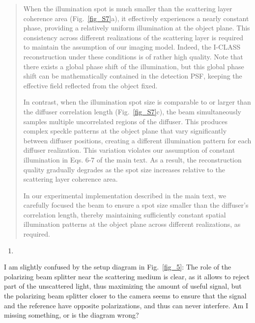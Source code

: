 \documentclass[12pt]{article}
\newenvironment{solved_reviewercomment}
    {\begin{tcolorbox}[width=\linewidth,colback=gray!5,colframe=solved_commentcolor!50,title=Reviewer Comment,left=5pt,right=5pt]}
    {\end{tcolorbox}}
\newenvironment{finished_ourresponse}
    {\begin{tcolorbox}[width=\linewidth,breakable,enhanced,colback=gray!5,colframe=finished_responsecolor!50,title=Response,left=5pt,right=5pt]}
    {\end{tcolorbox}}
\begin{document}
\begin{finished_ourresponse}
\begin{quote}
When the illumination spot is much smaller than the scattering layer coherence area (Fig.~\ref{fig_S7}a), it effectively experiences a nearly constant phase, providing a relatively uniform illumination at the object plane. This consistency across different realizations of the scattering layer is required to maintain the assumption of our imaging model. Indeed, the I-CLASS reconstruction under these conditions is of rather high quality.
Note that there exists a global phase shift of the illumination, but this global phase shift can be mathematically contained in the detection PSF, keeping the effective field reflected from the object fixed.

In contrast, when the illumination spot size is comparable to or larger than the diffuser correlation length (Fig.~\ref{fig_S7}c), the beam simultaneously samples multiple uncorrelated regions of the diffuser. This produces complex speckle patterns at the object plane that vary significantly between diffuser positions, creating a different illumination pattern for each diffuser realization. This variation violates our assumption of constant illumination in Eqs. 6-7 of the main text. As a result, the reconstruction quality gradually degrades as the spot size increases relative to the scattering layer coherence area. 

In our experimental implementation described in the main text, we carefully focused the beam to ensure a spot size smaller than the diffuser's correlation length, thereby maintaining sufficiently constant spatial illumination patterns at the object plane across different realizations, as required.
\end{quote}

\end{finished_ourresponse}

\begin{enumerate}[label=\arabic*., resume]
\item \leavevmode
\end{enumerate}
\vspace{-1em}
\begin{solved_reviewercomment}
    I am slightly confused by the setup diagram in Fig.~\ref{fig_5}: The role of the polarizing beam splitter near the scattering medium is clear, as it allows to reject part of the unscattered light, thus maximizing the amount of useful signal, but the polarizing beam splitter closer to the camera seems to ensure that the signal and the reference have opposite polarizations, and thus can never interfere. Am I missing something, or is the diagram wrong?
\end{solved_reviewercomment}
\end{document}
